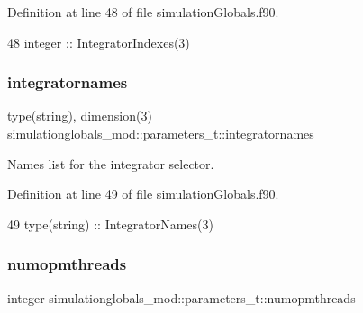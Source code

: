 Definition at line 48 of file simulation\+Globals.\+f90.


\begin{DoxyCode}
48         \textcolor{keywordtype}{integer}         :: IntegratorIndexes(3)
\end{DoxyCode}
\mbox{\label{structsimulationglobals__mod_1_1parameters__t_aede2d1d4d08c9f3d8b4b4f68029eed65}} 
\subsubsection{\texorpdfstring{integratornames}{integratornames}}
{\footnotesize\ttfamily type(string), dimension(3) simulationglobals\+\_\+mod\+::parameters\+\_\+t\+::integratornames\hspace{0.3cm}{\ttfamily [private]}}



Names list for the integrator selector. 



Definition at line 49 of file simulation\+Globals.\+f90.


\begin{DoxyCode}
49         \textcolor{keywordtype}{type}(string)    :: IntegratorNames(3)
\end{DoxyCode}
\mbox{\label{structsimulationglobals__mod_1_1parameters__t_a5223907bf0b209d2c3c4e6f034051915}} 
\subsubsection{\texorpdfstring{numopmthreads}{numopmthreads}}
{\footnotesize\ttfamily integer simulationglobals\+\_\+mod\+::parameters\+\_\+t\+::numopmthreads\hspace{0.3cm}{\ttfamily [private]}}



